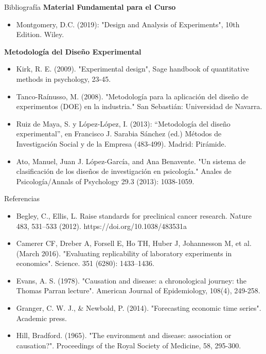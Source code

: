 ﻿\documentclass{beamer}
\begin{document}
\begin{frame}{Bibliografía}
    \textbf{Material Fundamental para el Curso}
    \begin{itemize}
        \item Montgomery, D.C. (2019): "Design and Analysis of Experiments", 10th Edition. Wiley.
    \end{itemize}
    
    \textbf{Metodología del Diseño Experimental}
    \begin{itemize}
        \item Kirk, R. E. (2009). "Experimental design", Sage handbook of quantitative methods in psychology, 23-45.        
        \item Tanco-Raínusso, M. (2008). "Metodología para la aplicación del diseño de experimentos (DOE) en la industria." San Sebastián: Universidad de Navarra.
        \item Ruiz de Maya, S. y López-López, I. (2013): “Metodología del diseño experimental”, en Francisco J. Sarabia Sánchez (ed.) Métodos de Investigación Social y de la Empresa (483-499). Madrid: Pirámide.
        \item Ato, Manuel, Juan J. López-García, and Ana Benavente. "Un sistema de clasificación de los diseños de investigación en psicología." Anales de Psicología/Annals of Psychology 29.3 (2013): 1038-1059.        
    \end{itemize}
\end{frame}

\begin{frame}{Referencias}
   \begin{itemize}
        \item Begley, C., Ellis, L. Raise standards for preclinical cancer research. Nature 483, 531–533 (2012). https://doi.org/10.1038/483531a
        \item Camerer CF, Dreber A, Forsell E, Ho TH, Huber J, Johannesson M, et al. (March 2016). "Evaluating replicability of laboratory experiments in economics". Science. 351 (6280): 1433–1436.     
        \item Evans, A. S. (1978). "Causation and disease: a chronological journey: the Thomas Parran lecture". American Journal of Epidemiology, 108(4), 249-258.
        \item Granger, C. W. J., \& Newbold, P. (2014). "Forecasting economic time series". Academic press.
        \item Hill, Bradford. (1965). "The environment and disease: association or causation?". Proceedings of the Royal Society of Medicine, 58, 295-300.    
    \end{itemize}
    
\end{frame}
\end{document}
